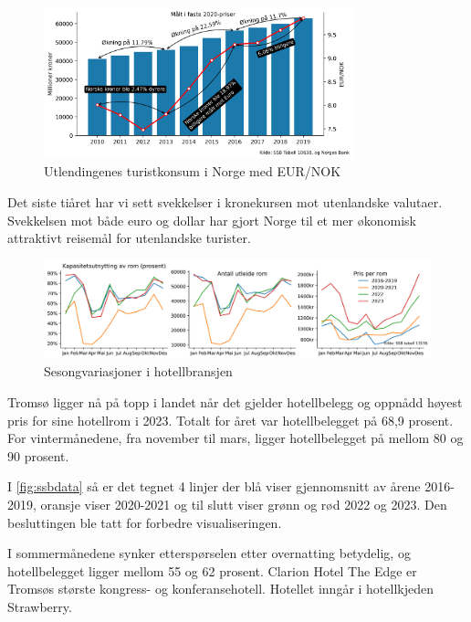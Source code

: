 \documentclass[
  12pt,
  a4paper,
  DIV=11,
  numbers=noendperiod]{scrartcl}
\begin{document}
\begin{figure}[h]
\centering
\includegraphics[width=0.8\textwidth]{dokumentobjekter/figurer/Utlendingenes_turistkonsum_i_Norge.png}
\caption{Utlendingenes turistkonsum i Norge med EUR/NOK}
\label{fig:konsum}
\end{figure}

Det siste tiåret har vi sett svekkelser i kronekursen mot utenlandske
valutaer. Svekkelsen mot både euro og dollar har gjort Norge til et mer
økonomisk attraktivt reisemål for utenlandske turister.

\begin{figure}[h]
\centering
  \includegraphics[width=\textwidth]{dokumentobjekter/figurer/ssbdata.png}
  \caption{Sesongvariasjoner i hotellbransjen}
  \label{fig:ssbdata}
\end{figure}

Tromsø ligger nå på topp i landet når det gjelder hotellbelegg og
oppnådd høyest pris for sine hotellrom i 2023. Totalt for året var
hotellbelegget på 68,9 prosent. For vintermånedene, fra november til
mars, ligger hotellbelegget på mellom 80 og 90 prosent.

I \autoref{fig:ssbdata} så er det tegnet 4 linjer der blå viser
gjennomsnitt av årene 2016-2019, oransje viser 2020-2021 og til slutt
viser grønn og rød 2022 og 2023. Den besluttingen ble tatt for forbedre
visualiseringen.

I sommermånedene synker etterspørselen etter overnatting betydelig, og
hotellbelegget ligger mellom 55 og 62 prosent. Clarion Hotel The Edge er
Tromsøs største kongress- og konferansehotell. Hotellet inngår i
hotellkjeden Strawberry.
\end{document}
